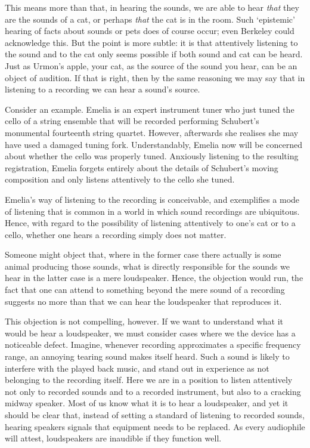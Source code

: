 \documentclass[sloppy, journal, git, bytitle, dodraft]{humapap}
\begin{document}
This means more than that, in hearing the sounds, we are able to hear \emph{that} they are the sounds of a cat, or perhaps \emph{that} the cat is in the room. Such `epistemic' hearing of facts about sounds or pets does of course occur; even Berkeley could acknowledge this. But the point is more subtle: it is that attentively listening to the sound and to the cat only seems possible if both sound and cat can be heard. Just as Urmon's apple, your cat, as the source of the sound you hear, can be an object of audition. If that is right, then by the same reasoning we may say that in listening to a recording we can hear a sound's source.

Consider an example. Emelia is an expert instrument tuner who just tuned the cello of a string ensemble that will be recorded performing Schubert's monumental fourteenth string quartet. However, afterwards she realises she may have used a damaged tuning fork. Understandably, Emelia now will be concerned about whether the cello was properly tuned. Anxiously listening to the resulting registration, Emelia forgets entirely about the details of Schubert's moving composition and only listens attentively to the cello she tuned. 

Emelia's way of listening to the recording is conceivable, and exemplifies a mode of listening that is common in a world in which sound recordings are ubiquitous. Hence, with regard to the possibility of listening attentively to one's cat or to a cello, whether one hears a recording simply does not matter.

Someone might object that, where in the former case there actually is some animal producing those sounds, what is directly responsible for the sounds we hear in the latter case is a mere loudspeaker. Hence, the objection would run, the fact that one can attend to something beyond the mere sound of a recording suggests no more than that we can hear the loudspeaker that reproduces it. 

This objection is not compelling, however. If we want to understand what it would be hear a loudspeaker, we must consider cases where we the device has a noticeable defect. Imagine, whenever recording approximates a specific frequency range, an annoying tearing sound makes itself heard. Such a sound is likely to interfere with the played back music, and stand out in experience as not belonging to the recording itself. Here we are in a position to listen attentively not only to recorded sounds and to a recorded instrument, but also to a cracking midway speaker. Most of us know what it is to hear a loudspeaker, and yet it should be clear that, instead of setting a standard of listening to recorded sounds, hearing speakers signals that equipment needs to be replaced. As every audiophile will attest, loudspeakers are inaudible if they function well.
\end{document}
